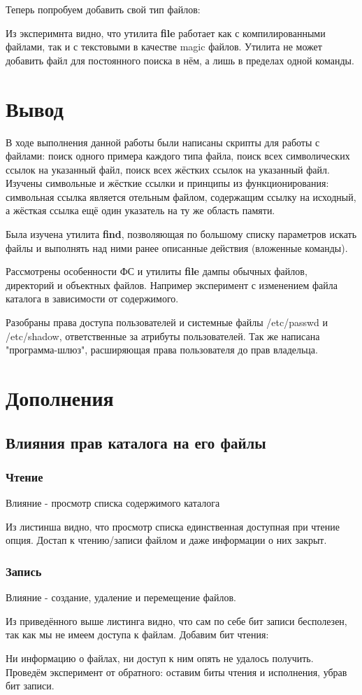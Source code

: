 \documentclass[a4paper]{article}
\begin{document}
Теперь попробуем добавить свой тип файлов:

Из эксперимнта  видно, что утилита \textbf{file} работает как с компилированными файлами, так и с текстовыми в качестве  magic файлов. Утилита не может добавить файл для постоянного поиска в нём, а лишь в пределах одной команды.
\section{ Вывод}
В ходе выполнения данной работы были написаны скрипты для работы с файлами: поиск одного примера каждого типа файла, поиск всех символических ссылок на указанный файл, поиск всех жёстких ссылок на указанный файл. Изучены символьные и жёсткие ссылки и принципы из функционирования: символьная ссылка является отельным файлом, содержащим ссылку на исходный, а жёсткая ссылка ещё один указатель на ту же область памяти.

Была изучена утилита \textbf{find}, позволяющая по большому списку параметров искать файлы и выполнять над ними ранее описанные действия (вложенные команды).

Рассмотрены особенности ФС и утилиты \textbf{file} дампы обычных файлов, директорий и объектных файлов. Например эксперимент с изменением файла каталога в зависимости от содержимого.

Разобраны права доступа пользователей и системные файлы /etc/passwd и /etc/shadow, ответственные за атрибуты пользователей. Так же написана "программа-шлюз", расширяющая права пользователя до прав владельца. 

\newpage
\section{Дополнения}
\subsection{Влияния прав каталога на его файлы}
\subsubsection{Чтение}
Влияние - просмотр списка содержимого каталога

Из листинша видно, что просмотр списка единственная доступная при чтение опция. Достап к чтению/записи файлом и даже информации о них закрыт.\\

\subsubsection{Запись}
Влияние - создание, удаление и перемещение файлов.

Из приведённого выше листинга видно, что сам по себе бит записи бесполезен, так как мы не имеем доступа к файлам. Добавим бит чтения:
 
Ни информацию о файлах, ни доступ к ним опять не удалось получить. Проведём эксперимент от обратного: оставим биты чтения и исполнения, убрав бит записи.

\end{document}
